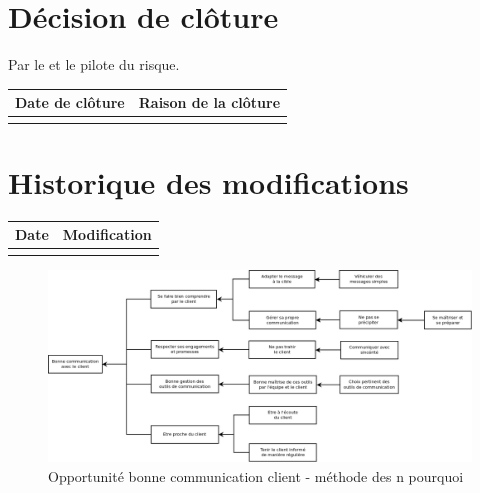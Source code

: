 \section*{Décision de clôture}
Par le \CP{} et le pilote du risque.
\begin{table}[h]
\centering
	\begin{tabularx}{16.8cm}{|X|X|}
	\hline
	\rowcolor{gray!40} Date de clôture & Raison de la clôture \\
	\hline
	  & \\
	\hline
	\end{tabularx}
\end{table}

\section*{Historique des modifications}
\begin{table}[h]
\centering
	\begin{tabularx}{16.8cm}{|X|X|}
	\hline
	\rowcolor{gray!40} Date & Modification \\%
	\hline
	  & \\
	\hline
	\end{tabularx}
\end{table}
\newpage


\begin{figure}
	\centering
	\includegraphics[scale=0.28]{images/AnalyseOpportunite_nPourquoi_FDO004}
	\caption{\label{opportunite bonne communication client}Opportunité bonne communication client - méthode des n pourquoi}
\end{figure}
